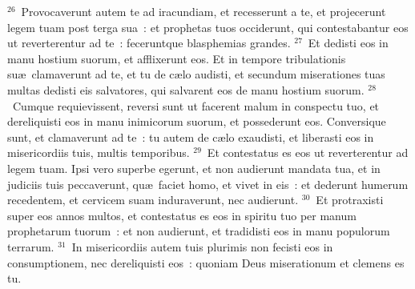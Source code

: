 ${}^{26}$~Provocaverunt autem te ad iracundiam, et recesserunt a te, et projecerunt legem tuam post terga sua~: et prophetas tuos occiderunt, qui contestabantur eos ut reverterentur ad te~: feceruntque blasphemias grandes.
${}^{27}$~Et dedisti eos in manu hostium suorum, et afflixerunt eos. Et in tempore tribulationis su\ae\ clamaverunt ad te, et tu de c\ae lo audisti, et secundum miserationes tuas multas dedisti eis salvatores, qui salvarent eos de manu hostium suorum.
${}^{28}$~Cumque requievissent, reversi sunt ut facerent malum in conspectu tuo, et dereliquisti eos in manu inimicorum suorum, et possederunt eos. Conversique sunt, et clamaverunt ad te~: tu autem de c\ae lo exaudisti, et liberasti eos in misericordiis tuis, multis temporibus.
${}^{29}$~Et contestatus es eos ut reverterentur ad legem tuam. Ipsi vero superbe egerunt, et non audierunt mandata tua, et in judiciis tuis peccaverunt, qu\ae\ faciet homo, et vivet in eis~: et dederunt humerum recedentem, et cervicem suam induraverunt, nec audierunt.
${}^{30}$~Et protraxisti super eos annos multos, et contestatus es eos in spiritu tuo per manum prophetarum tuorum~: et non audierunt, et tradidisti eos in manu populorum terrarum.
${}^{31}$~In misericordiis autem tuis plurimis non fecisti eos in consumptionem, nec dereliquisti eos~: quoniam Deus miserationum et clemens es tu.


